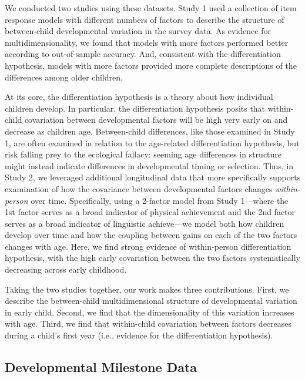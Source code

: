 \documentclass[man]{apa7}
\begin{document}
We conducted two studies using these datasets. Study 1 used a collection
of item response models with different numbers of factors to describe
the structure of between-child developmental variation in the survey
data. As evidence for multidimensionality, we found that models with
more factors performed better according to out-of-sample accuracy. And,
consistent with the differentiation hypothesis, models with more factors
provided more complete descriptions of the differences among older
children.

At its core, the differentiation hypothesis is a theory about how
individual children develop. In particular, the differentiation
hypothesis posits that within-child covariation between developmental
factors will be high very early on and decrease as children age.
Between-child differences, like those examined in Study 1, are often
examined in relation to the age-related differentiation hypothesis, but
risk falling prey to the ecological fallacy: seeming age differences in structure might
instead indicate differences in developmental timing or selection. Thus,
in Study 2, we leveraged additional longitudinal data that more
specifically supports examination of how the covariance between
developmental factors changes \emph{within-person} over time.
Specifically, using a 2-factor model from Study 1---where the 1st factor
serves as a broad indicator of physical achievement and the 2nd factor
serves as a broad indicator of linguistic achieve---we model both how
children develop over time and how the coupling between gains on each of
the two factors changes with age. Here, we find strong evidence of
within-person differentiation hypothesis, with the high early
covariation between the two factors systematically decreasing across
early childhood.

Taking the two studies together, our work makes three contributions.
First, we describe the between-child multidimensional structure of
developmental variation in early child. Second, we find that the
dimensionality of this variation increases with age. Third, we find that
within-child covariation between factors decreases during a child's
first year (i.e., evidence for the differentiation hypothesis).

\hypertarget{developmental-milestone-data}{%
\subsection*{Developmental Milestone
Data}\label{developmental-milestone-data}}
\end{document}

